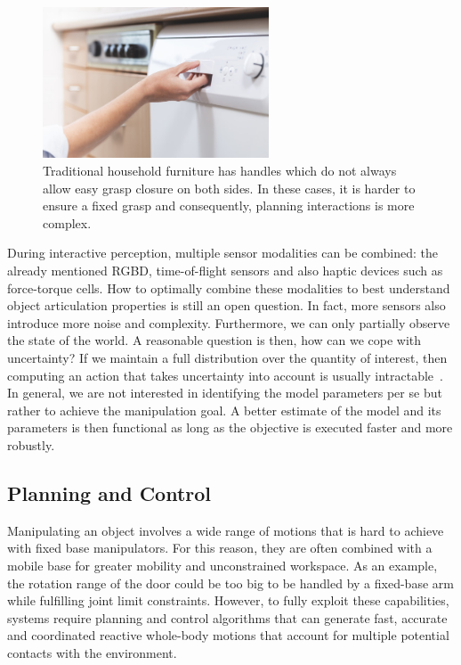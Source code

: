 \begin{figure}[t]
    \centering
    \includegraphics[width=0.6\textwidth]{images/dishwasher_handle.png}
    \caption{Traditional household furniture has handles which do not always allow easy grasp closure on both sides. In these cases, it is harder to ensure a fixed grasp and consequently, planning interactions is more complex.}
    \label{fig:dishwasher_handle}
\end{figure}


During interactive perception, multiple sensor modalities can be combined: the already mentioned RGBD, time-of-flight sensors and also haptic devices such as force-torque cells. How to optimally combine these modalities to best understand object articulation properties is still an open question. In fact, more sensors also introduce more noise and complexity. Furthermore, we can only partially observe the state of the world. A reasonable question is then, how can we cope with uncertainty? If we maintain a full distribution over the quantity of interest, then computing an action that takes uncertainty into account is usually intractable~\cite{lavalle2006planning}. In general, we are not interested in identifying the model parameters per se but rather to achieve the manipulation goal. A better estimate of the model and its parameters is then functional as long as the objective is executed faster and more robustly.

\subsection{Planning and Control}
Manipulating an object involves a wide range of motions that is hard to achieve with fixed base manipulators. For this reason, they are often combined with a mobile base for greater mobility and unconstrained workspace. As an example, the rotation range of the door could be too big to be handled by a fixed-base arm while fulfilling joint limit constraints. However, to fully exploit these capabilities, systems require planning and control algorithms that can generate fast, accurate and coordinated reactive whole-body motions that account for multiple potential contacts with the environment.

